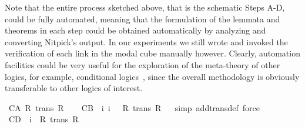 \begin{isabellebody}
\begin{isamarkuptext}
Note that the entire process sketched above, that is the schematic Steps A-D, could be fully automated, meaning that the formulation of the lemmata and theorems
in each step could be obtained automatically by analyzing and converting Nitpick's output.
In our experiments we still wrote and invoked the verification of each link in the 
modal cube manually however. Clearly, automation facilities could be very useful for the exploration of the meta-theory of other logics, for
example, conditional logics~\cite{IJCAI}, since the overall methodology is obviously transferable to other logics of interest.%
\end{isamarkuptext}%
\isamarkuptrue%
%
\begin{isamarkuptext}%
\begin{isbfig}{7em}
\end{isbfig}%
\end{isamarkuptext}%
\isamarkuptrue%
%
\isamarkuptrue%
\isamarkupfalse%
\ C{}{\isacharunderscore}A{\isacharcolon}\ {\isachardoublequoteopen}{\isasymforall}R{\isachardot}\ trans\ R{\isachardoublequoteclose}\ \isamarkupfalse%
%
\isadelimproof
\ %
\endisadelimproof
%
\isatagproof
{}\isamarkupfalse%
%
\endisatagproof
{\isafoldproof}%
%
\isadelimproof
%
\endisadelimproof
\isanewline
{}\isamarkupfalse%
\ C{}{\isacharunderscore}B{\isacharcolon}\ {\isachardoublequoteopen}{\isacharhash}\ i{}\ i{}\ {\isasymlongrightarrow}\ {\isasymnot}\ {\isacharparenleft}{\isasymforall}R{\isachardot}\ trans\ R{\isacharparenright}{\isachardoublequoteclose}%
\isadelimproof
\ %
\endisadelimproof
%
\isatagproof
{}\isamarkupfalse%
\ {\isacharparenleft}simp\ add{\isacharcolon}trans{\isacharunderscore}def{\isacharcomma}\ force{\isacharparenright}%
\endisatagproof
{\isafoldproof}%
%
\isadelimproof
%
\endisadelimproof
\isanewline
{}\isamarkupfalse%
\ C{}{\isacharunderscore}D{\isacharcolon}\ {\isachardoublequoteopen}{\isacharhash}\ i{}\ {\isasymlongrightarrow}\ {\isacharparenleft}{\isasymforall}R{\isachardot}\ trans\ R{\isacharparenright}{\isachardoublequoteclose}%

\end{isabellebody}
